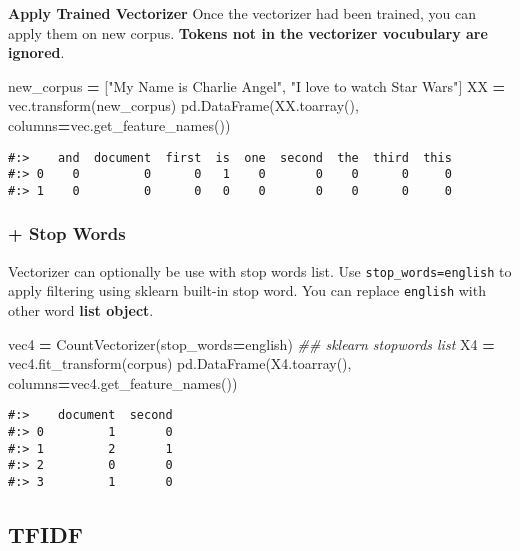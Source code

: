 \documentclass[
]{book}
\newenvironment{Shaded}{\begin{snugshade}}{\end{snugshade}}
\newcommand{\CommentTok}[1]{\textcolor[rgb]{0.37,0.37,0.37}{\textit{#1}}}
\newcommand{\NormalTok}[1]{#1}
\newcommand{\OperatorTok}[1]{\textcolor[rgb]{0.43,0.43,0.43}{\textbf{#1}}}
\newcommand{\StringTok}[1]{\textcolor[rgb]{0.5,0.5,0.5}{#1}}
\begin{document}
\textbf{Apply Trained Vectorizer} Once the vectorizer had been trained, you can apply them on new corpus. \textbf{Tokens not in the vectorizer vocubulary are ignored}.

\begin{Shaded}
\begin{Highlighting}[]
\NormalTok{new\_corpus }\OperatorTok{=}\NormalTok{ [}\StringTok{"My Name is Charlie Angel"}\NormalTok{, }\StringTok{"I love to watch Star Wars"}\NormalTok{]}
\NormalTok{XX }\OperatorTok{=}\NormalTok{ vec.transform(new\_corpus)}
\NormalTok{pd.DataFrame(XX.toarray(), columns}\OperatorTok{=}\NormalTok{vec.get\_feature\_names())}
\end{Highlighting}
\end{Shaded}

\begin{verbatim}
#:>    and  document  first  is  one  second  the  third  this
#:> 0    0         0      0   1    0       0    0      0     0
#:> 1    0         0      0   0    0       0    0      0     0
\end{verbatim}

\hypertarget{stop-words}{%
\subsubsection{+ Stop Words}\label{stop-words}}

Vectorizer can optionally be use with stop words list. Use \texttt{stop\_words=english} to apply filtering using sklearn built-in stop word. You can replace \texttt{english} with other word \textbf{list object}.

\begin{Shaded}
\begin{Highlighting}[]
\NormalTok{vec4 }\OperatorTok{=}\NormalTok{ CountVectorizer(stop\_words}\OperatorTok{=}\StringTok{\textquotesingle{}english\textquotesingle{}}\NormalTok{) }\CommentTok{\#\# sklearn stopwords list}
\NormalTok{X4 }\OperatorTok{=}\NormalTok{ vec4.fit\_transform(corpus)}
\NormalTok{pd.DataFrame(X4.toarray(), columns}\OperatorTok{=}\NormalTok{vec4.get\_feature\_names())}
\end{Highlighting}
\end{Shaded}

\begin{verbatim}
#:>    document  second
#:> 0         1       0
#:> 1         2       1
#:> 2         0       0
#:> 3         1       0
\end{verbatim}

\hypertarget{tfidf}{%
\subsection{TFIDF}\label{tfidf}}
\end{document}
